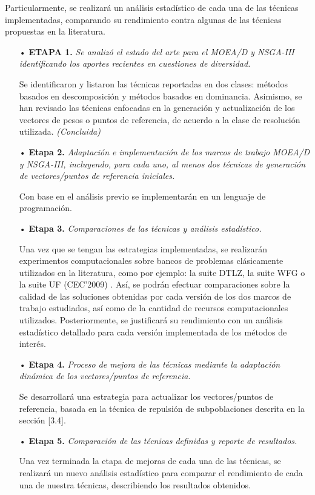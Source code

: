 \documentclass[letterpaper,10pt]{article}
\begin{document}
Particularmente, se realizará un análisis estadístico de cada una de las técnicas implementadas, comparando su rendimiento contra algunas de las  técnicas propuestas en la literatura.
 
 \begin{itemize}
 \item[•] \textbf{ETAPA 1.} \emph{Se analizó el estado del arte para el MOEA/D y NSGA-III identificando los aportes recientes en cuestiones de diversidad.}
\item[] Se identificaron y listaron las técnicas reportadas en dos clases: métodos basados en descomposición y métodos basados en dominancia. Asimismo, se han revisado las técnicas enfocadas en la generación y actualización de los vectores de pesos o puntos de referencia, de acuerdo a la clase de resolución utilizada.
\emph{(Concluida)}

\item[•] \textbf{Etapa 2.} \emph{Adaptación e implementación de los marcos de trabajo MOEA/D y NSGA-III, incluyendo, para cada uno, al menos dos técnicas de generación de vectores/puntos de referencia iniciales.}

\item[] Con base en el análisis previo se implementarán en un lenguaje de programación.
        
\item[•] \textbf{Etapa 3.} \emph{Comparaciones de las técnicas y análisis estadístico.}

\item [] Una vez que se tengan las estrategias implementadas, se realizarán experimentos computacionales sobre bancos de problemas clásicamente utilizados en la literatura, como por ejemplo: la suite DTLZ, la suite WFG o la suite UF (CEC'2009) \cite{coello2007evolutionary,zhang2008multiobjective}. Así, se podrán efectuar comparaciones sobre la calidad de las soluciones obtenidas por cada versión de los dos marcos de trabajo estudiados, así como de la cantidad de recursos computacionales utilizados. Posteriormente, se justificará su rendimiento con un análisis estadístico detallado para cada versión implementada de los métodos de interés.

\item[•] \textbf{Etapa 4.} \emph{Proceso de mejora de las técnicas mediante la adaptación dinámica de los vectores/puntos de referencia.}

\item[] Se desarrollará una estrategia para actualizar los vectores/puntos de referencia, basada en la técnica de repulsión de subpoblaciones descrita en la sección [3.4].

\item[•] \textbf{Etapa 5.} \emph{Comparación de las técnicas definidas y reporte de resultados.}

\item[] Una vez terminada la etapa de mejoras de cada una de las técnicas, se realizará un nuevo análisis estadístico para comparar el rendimiento de cada una de nuestra técnicas, describiendo los resultados obtenidos.
        
\end{itemize}
\end{document}

